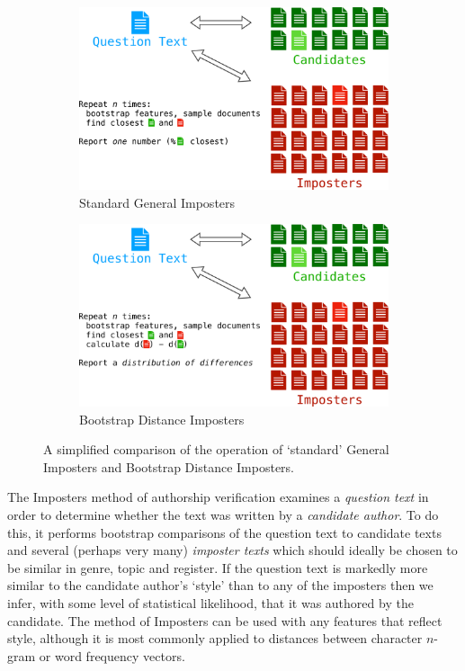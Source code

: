 \documentclass[
    hf
]{ceurart}
\begin{document}
\begin{figure}
    \centering
    \begin{subfigure}{.5\textwidth}
        \centering
        \includegraphics[width=0.93\linewidth]{images/bdi_graphic_gi-crop.pdf}
        \caption*{Standard General Imposters}
    \end{subfigure}%
    \begin{subfigure}{.5\textwidth}
        \centering
        \includegraphics[width=0.93\linewidth]{images/bdi_graphic_bdi-crop.pdf}
        \caption*{Bootstrap Distance Imposters}
    \end{subfigure}%
    \caption{A simplified comparison of the operation of `standard' General Imposters and
        Bootstrap Distance Imposters.}
    \label{fig:gibdi}
\end{figure}

The Imposters method of authorship verification examines a \emph{question text} in order to
determine whether the text was written by a \emph{candidate author}. To do this, it performs
bootstrap comparisons of the question text to candidate texts and several (perhaps very many)
\emph{imposter texts} which should ideally be chosen to be similar in genre, topic and register. If
the question text is markedly more similar to the candidate author's `style' than to any of the
imposters then we infer, with some level of statistical likelihood, that it was authored by the
candidate. The method of Imposters can be used with any features that reflect style, although it is
most commonly applied to distances between character $n$-gram or word frequency vectors.
\end{document}
